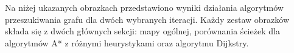 \documentclass[12pt,twoside]{article}
\begin{document}
Na niżej ukazanych obrazkach przedstawiono wyniki działania algorytmów przeszukiwania grafu dla dwóch wybranych iteracji. Każdy zestaw obrazków składa się z dwóch głównych sekcji: mapy ogólnej, porównania ścieżek dla algorytmów A* z różnymi heurystykami oraz algorytmu Dijkstry.


%
%    
%
\end{document}
